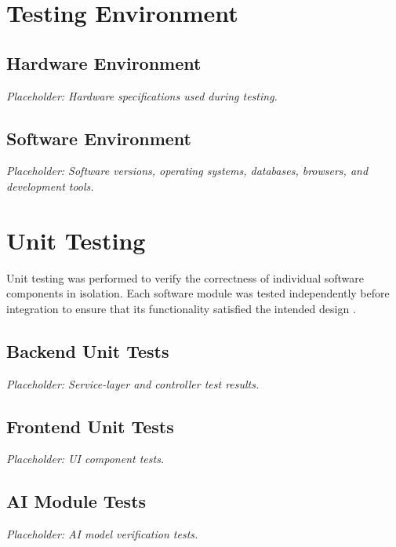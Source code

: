\section{Testing Environment}

\subsection{Hardware Environment}

\textit{Placeholder: Hardware specifications used during testing.}

\subsection{Software Environment}

\textit{Placeholder: Software versions, operating systems, databases, browsers, and development tools.}


\section{Unit Testing}

Unit testing was performed to verify the correctness of individual software components in isolation. Each software module was tested independently before integration to ensure that its functionality satisfied the intended design \cite{junit5}.

\subsection{Backend Unit Tests}

\textit{Placeholder: Service-layer and controller test results.}

\subsection{Frontend Unit Tests}

\textit{Placeholder: UI component tests.}

\subsection{AI Module Tests}

\textit{Placeholder: AI model verification tests.}


